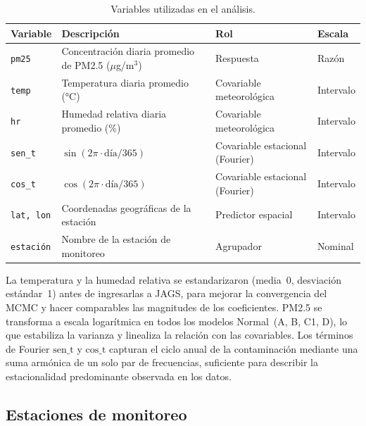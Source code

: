 ﻿\documentclass[12pt]{article}
\begin{document}
\begin{table}[H]
\centering
\caption{Variables utilizadas en el an\'alisis.}
\label{tab:variables}
\small
\begin{tabular}{>{\raggedright\arraybackslash}p{2.3cm}
                >{\raggedright\arraybackslash}p{6cm}
                >{\raggedright\arraybackslash}p{3.8cm}
                >{\raggedright\arraybackslash}p{2cm}}
\toprule
Variable & Descripci\'on & Rol & Escala \\
\midrule
\texttt{pm25}    & Concentraci\'on diaria promedio de PM2.5 ($\mu$g/m$^3$)
                 & Respuesta & Raz\'on \\
\texttt{temp}    & Temperatura diaria promedio (°C)
                 & Covariable meteorol\'ogica & Intervalo \\
\texttt{hr}      & Humedad relativa diaria promedio (\%)
                 & Covariable meteorol\'ogica & Intervalo \\
\texttt{sen\_t}  & $\sin(2\pi\cdot\text{d\'ia}/365)$
                 & Covariable estacional (Fourier) & Intervalo \\
\texttt{cos\_t}  & $\cos(2\pi\cdot\text{d\'ia}/365)$
                 & Covariable estacional (Fourier) & Intervalo \\
\texttt{lat, lon}& Coordenadas geogr\'aficas de la estaci\'on
                 & Predictor espacial & Intervalo \\
\texttt{estaci\'on}& Nombre de la estaci\'on de monitoreo
                 & Agrupador & Nominal \\
\bottomrule
\end{tabular}
\normalsize
\end{table}

La temperatura y la humedad relativa se estandarizaron
(media~0, desviaci\'on est\'andar~1) antes de ingresarlas a JAGS,
para mejorar la convergencia del MCMC y hacer comparables las magnitudes
de los coeficientes.
PM2.5 se transforma a escala logar\'itmica en todos los modelos
Normal~(A, B, C1, D), lo que estabiliza la varianza y linealiza la
relaci\'on con las covariables.
Los t\'erminos de Fourier $\text{sen\_t}$ y $\text{cos\_t}$ capturan el ciclo anual de la
contaminaci\'on mediante una suma armónica de un solo par de frecuencias,
suficiente para describir la estacionalidad predominante observada en los datos.

\subsection*{Estaciones de monitoreo}
\end{document}
